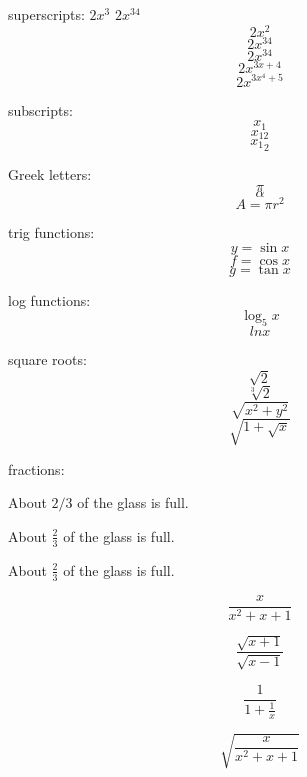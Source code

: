 \documentclass[11pt]{article}
\begin{document}
superscripts: $2x^3$
$2x^34$
$$2x^2$$
$$2x^34$$
$$2x^{34}$$
$$2x^{3x+4}$$
$$2x^{3x^4+5}$$

subscripts:
$$x_1$$
$$x_{12}$$
$${x_1}_2$$

Greek letters:
$$\pi$$
$$\alpha$$
$$A=\pi r^2$$

trig functions:
$$y=\sin{x}$$
$$f=\cos{x}$$
$$g=\tan{x}$$

log functions:
$$\log_5{x}$$
$$ln{x}$$

square roots:
$$\sqrt{2}$$
$$\sqrt[3]{2}$$
$$\sqrt{x^2+y^2}$$
$$\sqrt{1+\sqrt{x}}$$

fractions:

About $2/3$ of the glass is full.

About $\frac{2}{3}$ of the glass is full.

About $\displaystyle{\frac{2}{3}}$ of the glass is full.

$$\frac{x}{x^2+x+1}$$

$$\frac{\sqrt{x+1}}{\sqrt{x-1}}$$

$$\frac{1}{1+\frac{1}{x}}$$

$$\sqrt{\frac{x}{x^2+x+1}}$$
\end{document}
